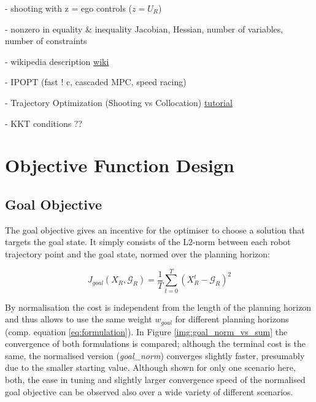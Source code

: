 - shooting with z = ego controls ($z = U_R$)

- nonzero in equality \& inequality Jacobian, Hessian, number of variables, number of constraints 

- wikipedia description \href{https://en.wikipedia.org/wiki/Trajectory_optimization}{wiki}

- \ac{IPOPT} (fast ! c, cascaded MPC, speed racing)

- Trajectory Optimization (Shooting vs Collocation) \href{https://epubs.siam.org/doi/pdf/10.1137/16M1062569}{tutorial}

- KKT conditions ??

\section{Objective Function Design}
\label{text:approach/objective}

\subsection{Goal Objective}
\label{text:approach/objective/goal}
The goal objective gives an incentive for the optimiser to choose a solution that targets the goal state. It simply consists of the L2-norm between each robot trajectory point and the goal state, normed over the planning horizon:

\begin{equation}
J_{goal}(X_R, \mathcal{G}_R) = \frac{1}{T} \sum_{t = 0}^T (X_R^t - \mathcal{G}_R)^2
\end{equation}

By normalisation the cost is independent from the length of the planning horizon and thus allows to use the same weight $w_{goal}$ for different planning horizons (comp. equation \ref{eq:formulation}). In Figure \ref{img:goal_norm_vs_sum} the convergence of both formulations is compared; although the terminal cost is the same, the normalised version (\textit{goal\_norm}) converges slightly faster, presumably due to the smaller starting value. Although shown for only one scenario here, both, the ease in tuning and slightly larger convergence speed of the normalised goal objective can be observed also over a wide variety of different scenarios.  

